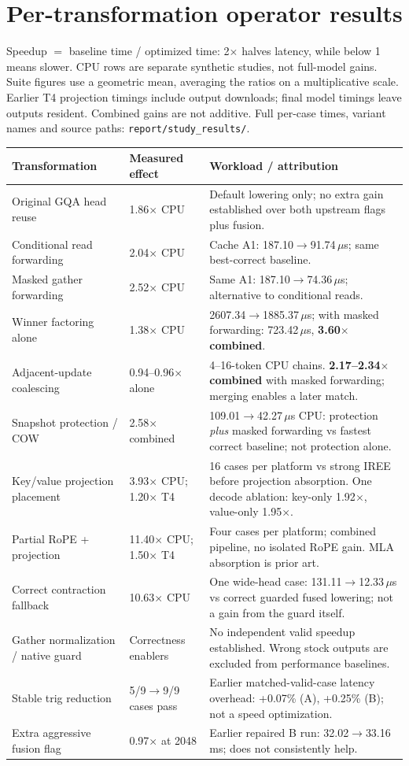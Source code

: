 \documentclass[10pt,a4paper]{article}
\newcommand{\code}[1]{\texttt{#1}}
\newcommand{\smallnote}[1]{{\footnotesize #1\par}}
\begin{document}
\section{Per-transformation operator results}
\smallnote{Speedup $=$ baseline time / optimized time: 2$\times$ halves latency, while below 1 means slower. CPU rows are separate synthetic studies, not full-model gains. Suite figures use a geometric mean, averaging the ratios on a multiplicative scale. Earlier T4 projection timings include output downloads; final model timings leave outputs resident. Combined gains are not additive. Full per-case times, variant names and source paths: \code{report/study\_results/}.}
{\small
\begin{tabularx}{\linewidth}{@{}P{40mm}P{29mm}Y@{}}
\toprule
\textbf{Transformation} & \textbf{Measured effect} & \textbf{Workload / attribution}\hfill\cite{project}\\
\midrule
Original GQA head reuse &1.86$\times$ CPU&Default lowering only; no extra gain established over both upstream flags plus fusion.\\
Conditional read forwarding &2.04$\times$ CPU&Cache A1: 187.10$\to$91.74\,$\mu$s; same best-correct baseline.\\
Masked gather forwarding &2.52$\times$ CPU&Same A1: 187.10$\to$74.36\,$\mu$s; alternative to conditional reads.\\
Winner factoring alone &1.38$\times$ CPU&2607.34$\to$1885.37\,$\mu$s; with masked forwarding: 723.42\,$\mu$s, \textbf{3.60$\times$ combined}.\\
Adjacent-update coalescing &0.94--0.96$\times$ alone&4--16-token CPU chains. \textbf{2.17--2.34$\times$ combined} with masked forwarding; merging enables a later match.\\
Snapshot protection / COW &2.58$\times$ combined&109.01$\to$42.27\,$\mu$s CPU: protection \emph{plus} masked forwarding vs fastest correct baseline; not protection alone.\\
Key/value projection placement &3.93$\times$ CPU; 1.20$\times$ T4&16 cases per platform vs strong IREE before projection absorption. One decode ablation: key-only 1.92$\times$, value-only 1.95$\times$.\\
Partial RoPE + projection &11.40$\times$ CPU; 1.50$\times$ T4&Four cases per platform; combined pipeline, no isolated RoPE gain. MLA absorption is prior art.\\
Correct contraction fallback &10.63$\times$ CPU&One wide-head case: 131.11$\to$12.33\,$\mu$s vs correct guarded fused lowering; not a gain from the guard itself.\\
Gather normalization / native guard &Correctness enablers&No independent valid speedup established. Wrong stock outputs are excluded from performance baselines.\\
Stable trig reduction &5/9$\to$9/9 cases pass&Earlier matched-valid-case latency overhead: +0.07\% (A), +0.25\% (B); not a speed optimization.\\
Extra aggressive fusion flag &0.97$\times$ at 2048&Earlier repaired B run: 32.02$\to$33.16\,ms; does not consistently help.\\
\bottomrule
\end{tabularx}}
\end{document}
